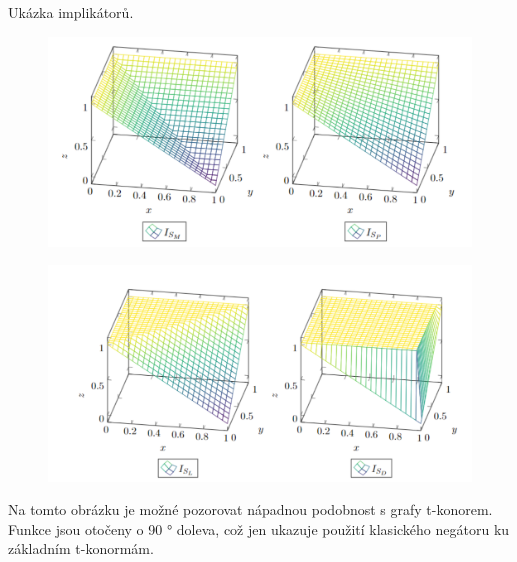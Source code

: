 \begin{graph} Uk\' azka implik\' ator\r u.
    \begin{figure}[H]
                \hspace{-1cm}
                \includegraphics[scale=0.65]{template-fig/impl1.pdf}
                \centering
            \end{figure}
            \begin{figure}[H]
                \hspace{-1cm}
                \includegraphics[scale=0.65]{template-fig/impl2.pdf}
                \centering
            \end{figure}

\end{graph}
Na tomto obrázku je možné pozorovat nápadnou podobnost s grafy t-konorem. Funkce jsou otočeny o 90 ° doleva, což jen ukazuje použití klasick\' eho negátoru ku základním t-konormám. 


